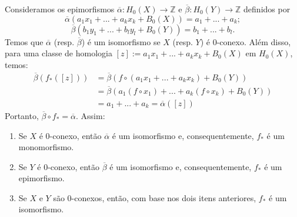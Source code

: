 \begin{dem}
    Consideramos os epimorfismos $\overline{\alpha}:H_0(X)\rightarrow\mathbb{Z}$ e $\overline{\beta}:H_0(Y)\rightarrow\mathbb{Z}$ definidos por 
    \[\overline{\alpha}(a_1x_1+...+a_kx_k+B_0(X))=a_1+...+a_k;\]
    \[\overline{\beta}(b_1y_1+...+b_ly_l+B_0(Y))=b_1+...+b_l.\]
    Temos que $\overline{\alpha}$ (resp. $\overline{\beta}$) é um isomorfismo se $X$ (resp. $Y$) é 0-conexo. Além disso, para uma classe de homologia $[z]:=a_1x_1+...+a_kx_k+B_0(X)$ em $H_0(X)$, temos: 
    \begin{align*}
        \overline{\beta}(f_*([z]))&=\overline{\beta}(f\circ (a_1x_1+...+a_kx_k)+B_0(Y))\\
        &=\overline{\beta}(a_1(f\circ x_1)+...+a_k (f\circ x_k)+B_0(Y))\\
        &=a_1+...+a_k=\overline{\alpha}([z])
    \end{align*}
    Portanto, $\overline{\beta}\circ f_*=\overline{\alpha}$. Assim:
    \begin{enumerate}
        \item Se $X$ é 0-conexo, então $\overline{\alpha}$ é um isomorfismo e, consequentemente, $f_*$ é um monomorfismo.
        \item Se $Y$ é 0-conexo, então $\overline{\beta}$ é um isomorfismo e, consequentemente, $f_*$ é um epimorfismo.
        \item Se $X$ e $Y$ são 0-conexos, então, com base nos dois itens anteriores, $f_*$ é um isomorfismo.
    \end{enumerate}
\end{dem}


